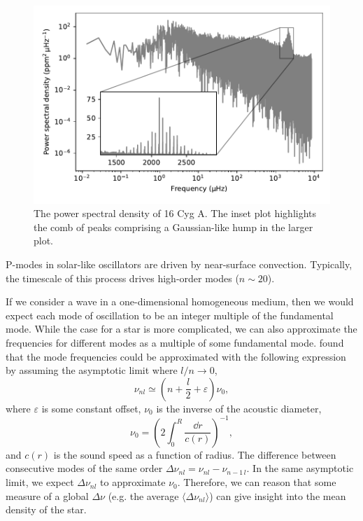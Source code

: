 \begin{figure}[tb]
    \centering
    \includegraphics{figures/seismo-psd.pdf}
    \caption{The power spectral density of 16 Cyg A. The inset plot highlights the comb of peaks comprising a Gaussian-like hump in the larger plot.}
    \label{fig:seismo-psd}
\end{figure}

P-modes in solar-like oscillators are driven by near-surface convection. Typically, the timescale of this process drives high-order modes (\(n \sim 20\)). 

If we consider a wave in a one-dimensional homogeneous medium, then we would expect each mode of oscillation to be an integer multiple of the fundamental mode. While the case for a star is more complicated, we can also approximate the frequencies for different modes as a multiple of some fundamental mode. \citet{Tassoul1980} found that the mode frequencies could be approximated with the following expression by assuming the asymptotic limit where \(l/n \rightarrow 0\),
%
\begin{equation}
    \nu_{nl} \simeq \left(n + \frac{l}{2} + \varepsilon\right) \nu_0,
\end{equation}
%
where \(\varepsilon\) is some constant offset, \(\nu_0\) is the inverse of the acoustic diameter,
%
\begin{equation}
    \nu_0 = \left(2 \int_{0}^{R} \frac{\dd r}{c(r)}\right)^{-1},
\end{equation}
%
and \(c(r)\) is the sound speed as a function of radius. The difference between consecutive modes of the same order \(\Delta\nu_{nl} = \nu_{nl} - \nu_{n-1\,l}\). In the same asymptotic limit, we expect \(\Delta\nu_{nl}\) to approximate \(\nu_0\). Therefore, we can reason that some measure of a global \(\Delta\nu\) (e.g. the average \(\langle\Delta\nu_{nl}\rangle\)) can give insight into the mean density of the star.

